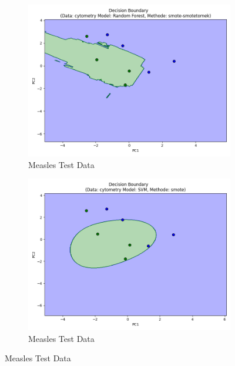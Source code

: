 \documentclass[12pt,a4paper]{report}
\begin{document}
\begin{figure}[h!]
    \vspace{1em}

    \begin{subfigure}[b]{0.49\textwidth}
        \centering
        \includegraphics[width=\textwidth]{images/test_decision_boundary_M.png} 
        \caption{Measles Test Data} 
        \label{fig:test_decision_boundary_M}
    \end{subfigure}
    \hfill
    \begin{subfigure}[b]{0.49\textwidth}
        \centering
        \includegraphics[width=\linewidth]{images/test2_decision_boundary_M.png}
        \caption{Measles Test Data} 
        \label{fig:test2_decision_boundary_M} 
    \end{subfigure}


\end{figure}
\end{document}
